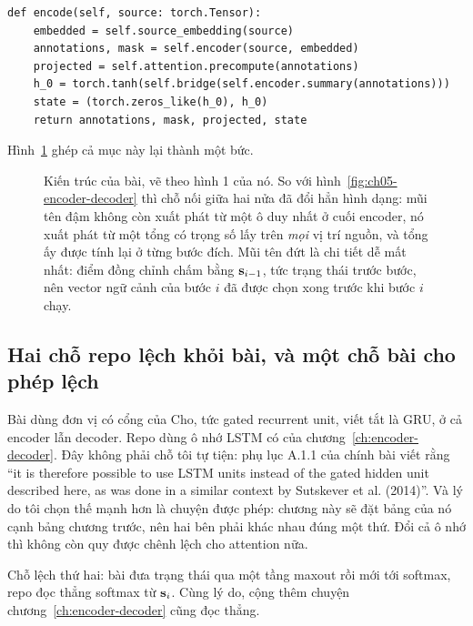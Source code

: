 \begin{verbatim}
def encode(self, source: torch.Tensor):
    embedded = self.source_embedding(source)
    annotations, mask = self.encoder(source, embedded)
    projected = self.attention.precompute(annotations)
    h_0 = torch.tanh(self.bridge(self.encoder.summary(annotations)))
    state = (torch.zeros_like(h_0), h_0)
    return annotations, mask, projected, state
\end{verbatim}

Hình~\ref{fig:ch06-kien-truc} ghép cả mục này lại thành một bức.

\begin{figure}[htbp]
  \centering
  
  \caption{Kiến trúc của bài, vẽ theo hình 1 của nó. So với
    hình~\ref{fig:ch05-encoder-decoder} thì chỗ nối giữa hai nửa đã đổi hẳn
    hình dạng: mũi tên đậm không còn xuất phát từ một ô duy nhất ở cuối
    encoder, nó xuất phát từ một tổng có trọng số lấy trên \emph{mọi} vị trí
    nguồn, và tổng ấy được tính lại ở từng bước đích. Mũi tên đứt là chi tiết
    dễ mất nhất: điểm đồng chỉnh chấm bằng \(\mathbf{s}_{i-1}\), tức trạng thái
    trước bước, nên vector ngữ cảnh của bước \(i\) đã được chọn xong trước khi
    bước \(i\) chạy.}
  \label{fig:ch06-kien-truc}
\end{figure}

\subsection*{Hai chỗ repo lệch khỏi bài, và một chỗ bài cho phép lệch}

%
Bài dùng đơn vị có cổng của Cho, tức gated recurrent unit, viết tắt là GRU, ở
cả encoder lẫn decoder. Repo dùng ô nhớ LSTM có  của
chương~\ref{ch:encoder-decoder}. Đây không phải chỗ tôi tự tiện: phụ lục A.1.1
của chính bài viết rằng \enquote{it is therefore possible to use LSTM units
instead of the gated hidden unit described here, as was done in a similar
context by Sutskever et al. (2014)}. Và lý do tôi chọn thế mạnh hơn là chuyện
được phép: chương này sẽ đặt bảng của nó cạnh bảng chương trước, nên hai bên
phải khác nhau đúng một thứ. Đổi cả ô nhớ thì không còn quy được chênh lệch cho
attention nữa.

Chỗ lệch thứ hai: bài đưa trạng thái qua một tầng maxout rồi mới tới softmax,
repo đọc thẳng softmax từ \(\mathbf{s}_i\). Cùng lý do, cộng thêm chuyện
chương~\ref{ch:encoder-decoder} cũng đọc thẳng.

